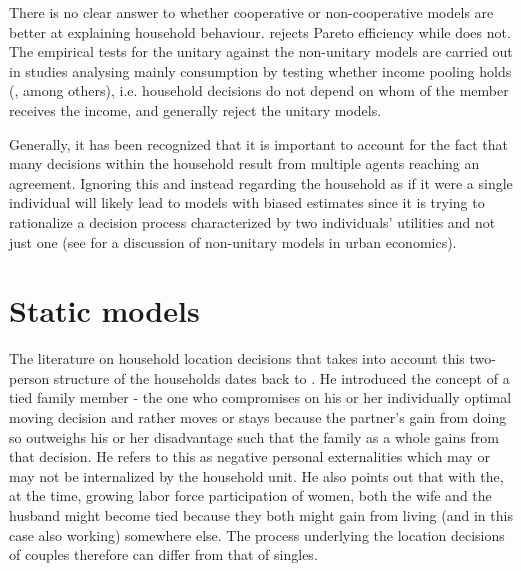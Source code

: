 There is no clear answer to whether cooperative or non-cooperative models are better at explaining household behaviour. \cite{Udry1996} rejects Pareto efficiency while \cite{Bobonis2009} does not. The empirical tests for the unitary against the non-unitary models are carried out in studies analysing mainly consumption by testing whether income pooling holds (\cite{Lundbergetal1997,AttanasioLechene2002}, among others), i.e. household decisions do not depend on whom of the member receives the income, and generally reject the unitary models. 

Generally, it has been recognized that it is important to account for the fact that many decisions within the household result from multiple agents reaching an agreement. Ignoring this and instead regarding the household as if it were a single individual will likely lead to models with biased estimates since it is trying to rationalize a decision process characterized by two individuals' utilities and not just one (see \cite{Picardetal2013} for a discussion of non-unitary models in urban economics). 

\section{Static models}
The literature on household location decisions that takes into account this two-person structure of the households dates back to \cite{Mincer1978}. He introduced the concept of a tied family member - the one who compromises on his or her individually optimal moving decision and rather moves or stays because the partner's gain from doing so outweighs his or her disadvantage such that the family as a whole gains from that decision. He refers to this as negative personal externalities which may or may not be internalized by the household unit. He also points out that with the, at the time, growing labor force participation of women, both the wife and the husband might become tied because they both might gain from living (and in this case also working) somewhere else. The process underlying the location decisions of couples therefore can differ from that of singles.


